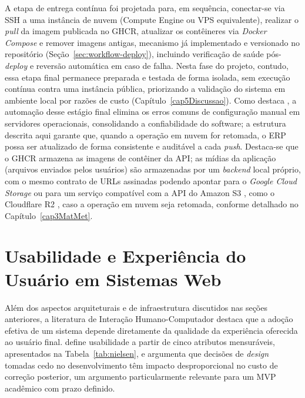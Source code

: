 A etapa de entrega contínua foi projetada para, em sequência, conectar-se via SSH a uma instância de nuvem (Compute Engine ou VPS equivalente), realizar o \textit{pull} da imagem publicada no GHCR, atualizar os contêineres via \textit{Docker Compose} e remover imagens antigas, mecanismo já implementado e versionado no repositório (Seção~\ref{sec:workflow-deploy}), incluindo verificação de saúde pós-\textit{deploy} e reversão automática em caso de falha. Nesta fase do projeto, contudo, essa etapa final permanece preparada e testada de forma isolada, sem execução contínua contra uma instância pública, priorizando a validação do sistema em ambiente local por razões de custo (Capítulo~\ref{cap5Discussao}). Como destaca , a automação desse estágio final elimina os erros comuns de configuração manual em servidores operacionais, consolidando a confiabilidade do software; a estrutura descrita aqui garante que, quando a operação em nuvem for retomada, o ERP possa ser atualizado de forma consistente e auditável a cada \textit{push}. Destaca-se que o GHCR armazena as imagens de contêiner da API; as mídias da aplicação (arquivos enviados pelos usuários) são armazenadas por um \textit{backend} local próprio, com o mesmo contrato de URLs assinadas podendo apontar para o \textit{Google Cloud Storage} \cite{gcs-docs} ou para um serviço compatível com a API do Amazon S3 \cite{s3-docs}, como o Cloudflare R2 \cite{r2-docs}, caso a operação em nuvem seja retomada, conforme detalhado no Capítulo~\ref{cap3MatMet}.

\section{Usabilidade e Experiência do Usuário em Sistemas Web}
\label{sec:usabilidade-ux}

Além dos aspectos arquiteturais e de infraestrutura discutidos nas seções anteriores, a literatura de Interação Humano-Computador destaca que a adoção efetiva de um sistema depende diretamente da qualidade da experiência oferecida ao usuário final.  define usabilidade a partir de cinco atributos mensuráveis, apresentados na Tabela~\ref{tab:nielsen}, e argumenta que decisões de \textit{design} tomadas cedo no desenvolvimento têm impacto desproporcional no custo de correção posterior, um argumento particularmente relevante para um MVP acadêmico com prazo definido.


